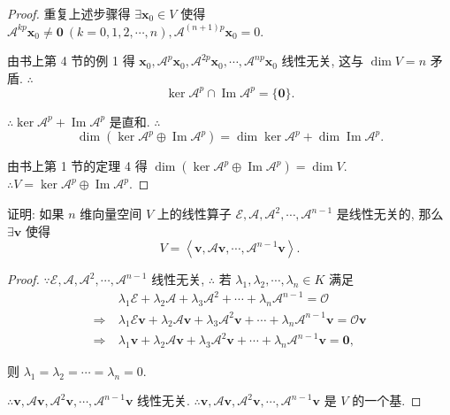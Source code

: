 \documentclass{ctexart}
\begin{document}
\begin{proof}
    重复上述步骤得 $\exists\boldsymbol{x}_0\in V$ 使得 $\mathcal{A}^{kp}\boldsymbol{x}_0\neq\boldsymbol{0}\ (k=0,1,2,\cdots,n),\mathcal{A}^{(n+1)p}\boldsymbol{x}_0=0$.

    由书上第 4 节的例 1 得 $\boldsymbol{x}_0,\mathcal{A}^p\boldsymbol{x}_0,\mathcal{A}^{2p}\boldsymbol{x}_0,\cdots,\mathcal{A}^{np}\boldsymbol{x}_0$ 线性无关, 这与 $\dim V=n$ 矛盾. $\therefore$
    \[\ker\mathcal{A}^p\cap\operatorname{Im}\mathcal{A}^p=\{\boldsymbol{0}\}.\]

    $\therefore\ker\mathcal{A}^p+\operatorname{Im}\mathcal{A}^p$ 是直和. $\therefore$
    \[\dim(\ker\mathcal{A}^p\oplus\operatorname{Im}\mathcal{A}^p)=\dim\ker\mathcal{A}^p+\dim\operatorname{Im}\mathcal{A}^p.\]

    由书上第 1 节的定理 4 得 $\dim(\ker\mathcal{A}^p\oplus\operatorname{Im}\mathcal{A}^p)=\dim V$. $\therefore V=\ker\mathcal{A}^p\oplus\operatorname{Im}\mathcal{A}^p$.
\end{proof}
\begin{exercise}%
    证明: 如果 $n$ 维向量空间 $V$ 上的线性算子 $\mathcal{E},\mathcal{A},\mathcal{A}^2,\cdots,\mathcal{A}^{n-1}$ 是线性无关的, 那么 $\exists\boldsymbol{v}$ 使得
    \[V=\left<\boldsymbol{v},\mathcal{A}\boldsymbol{v},\cdots,\mathcal{A}^{n-1}\boldsymbol{v}\right>.\]
\end{exercise}
\begin{proof}
    $\because\mathcal{E},\mathcal{A},\mathcal{A}^2,\cdots,\mathcal{A}^{n-1}$ 线性无关, $\therefore$ 若 $\lambda_1,\lambda_2,\cdots,\lambda_n\in K$ 满足
    \begin{align*}
        & \lambda_1\mathcal{E}+\lambda_2\mathcal{A}+\lambda_3\mathcal{A}^2+\cdots+\lambda_n\mathcal{A}^{n-1}=\mathcal{O} \\
        \Rightarrow\ & \lambda_1\mathcal{E}\boldsymbol{v}+\lambda_2\mathcal{A}\boldsymbol{v}+\lambda_3\mathcal{A}^2\boldsymbol{v}+\cdots+\lambda_n\mathcal{A}^{n-1}\boldsymbol{v}=\mathcal{O}\boldsymbol{v} \\
        \Rightarrow\ & \lambda_1\boldsymbol{v}+\lambda_2\mathcal{A}\boldsymbol{v}+\lambda_3\mathcal{A}^2\boldsymbol{v}+\cdots+\lambda_n\mathcal{A}^{n-1}\boldsymbol{v}=\boldsymbol{0},
    \end{align*}

    则 $\lambda_1=\lambda_2=\cdots=\lambda_n=0$.

    $\therefore\boldsymbol{v},\mathcal{A}\boldsymbol{v},\mathcal{A}^2\boldsymbol{v},\cdots,\mathcal{A}^{n-1}\boldsymbol{v}$ 线性无关. $\therefore\boldsymbol{v},\mathcal{A}\boldsymbol{v},\mathcal{A}^2\boldsymbol{v},\cdots,\mathcal{A}^{n-1}\boldsymbol{v}$ 是 $V$ 的一个基.
\end{proof}
\end{document}
